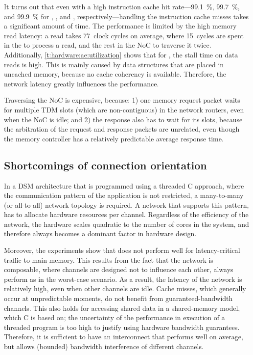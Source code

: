 It turns out that even with a high instruction cache hit rate---\SI{99.1}{\percent}, \SI{99.7}{\percent}, and \SI{99.9}{\percent} for , , and , respectively---handling the instruction cache misses takes a significant amount of time.
The performance is limited by the high memory read latency: a read takes 77~clock cycles on average, where 15~cycles are spent in the  to process a read, and the rest in the \ac{NoC} to traverse it twice.
Additionally, \vref{t:hardware:ae:utilization} shows that for , the stall time on data reads is high.
This is mainly caused by data structures that are placed in uncached memory, because no cache coherency is available.
Therefore, the network latency greatly influences the performance.

Traversing the \ac{NoC} is expensive, because:
1) one memory request packet waits for multiple \ac{TDM} slots (which are non-contiguous) in the network routers, even when the \ac{NoC} is idle; and
2) the response also has to wait for its slots, because the arbitration of the request and response packets are unrelated, even though the memory controller has a relatively predictable average response time.

\subsection{Shortcomings of connection orientation}
\label{s:hardware:ae:problems}

In a \ac{DSM} architecture that is programmed using a threaded C approach, where the communication pattern of the application is not restricted, a many-to-many (or all-to-all) network topology is required.
A  network that supports this pattern, has to allocate hardware resources per channel.
Regardless of the efficiency of the network, the hardware scales quadratic to the number of cores in the system, and therefore always becomes a dominant factor in hardware design.

Moreover, the experiments show that \aethereal* does not perform well for latency-critical traffic to main memory.
This results from the fact that the network is composable, where channels are designed not to influence each other, \ie always perform as in the worst-case scenario.
As a result, the latency of the network is relatively high, even when other channels are idle.
Cache misses, which generally occur at unpredictable moments, do not benefit from guaranteed-bandwidth channels.
This also holds for accessing shared data in a shared-memory model, which C is based on; the uncertainty of the performance in execution of a threaded program is too high to justify using hardware bandwidth guarantees.
Therefore, it is sufficient to have an interconnect that performs well on average, but allows (bounded) bandwidth interference of different channels.

